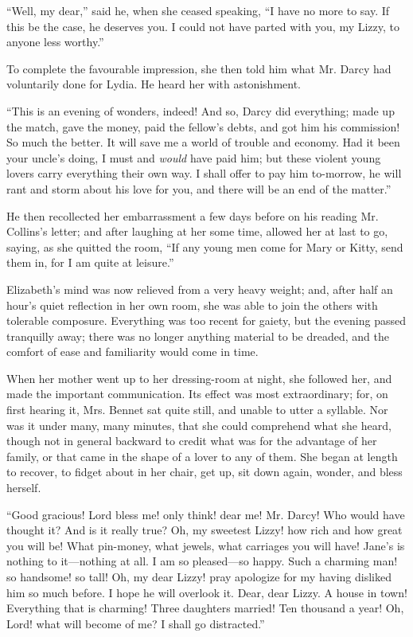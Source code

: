 ``Well, my dear,'' said he, when she ceased speaking, ``I have no more to say. If this be the case, he deserves you. I could not have parted with you, my Lizzy, to anyone less worthy.''

To complete the favourable impression, she then told him what Mr. Darcy had voluntarily done for Lydia. He heard her with astonishment.

``This is an evening of wonders, indeed! And so, Darcy did everything; made up the match, gave the money, paid the fellow's debts, and got him his commission! So much the better. It will save me a world of trouble and economy. Had it been your uncle's doing, I must and \textit{would} have paid him; but these violent young lovers carry everything their own way. I shall offer to pay him to-morrow, he will rant and storm about his love for you, and there will be an end of the matter.''

He then recollected her embarrassment a few days before on his reading Mr. Collins's letter; and after laughing at her some time, allowed her at last to go, saying, as she quitted the room, ``If any young men come for Mary or Kitty, send them in, for I am quite at leisure.''

Elizabeth's mind was now relieved from a very heavy weight; and, after half an hour's quiet reflection in her own room, she was able to join the others with tolerable composure. Everything was too recent for gaiety, but the evening passed tranquilly away; there was no longer anything material to be dreaded, and the comfort of ease and familiarity would come in time.

When her mother went up to her dressing-room at night, she followed her, and made the important communication. Its effect was most extraordinary; for, on first hearing it, Mrs. Bennet sat quite still, and unable to utter a syllable. Nor was it under many, many minutes, that she could comprehend what she heard, though not in general backward to credit what was for the advantage of her family, or that came in the shape of a lover to any of them. She began at length to recover, to fidget about in her chair, get up, sit down again, wonder, and bless herself.

``Good gracious! Lord bless me! only think! dear me! Mr. Darcy! Who would have thought it? And is it really true? Oh, my sweetest Lizzy! how rich and how great you will be! What pin-money, what jewels, what carriages you will have! Jane's is nothing to it---nothing at all. I am so pleased---so happy. Such a charming man! so handsome! so tall! Oh, my dear Lizzy! pray apologize for my having disliked him so much before. I hope he will overlook it. Dear, dear Lizzy. A house in town! Everything that is charming! Three daughters married! Ten thousand a year! Oh, Lord! what will become of me? I shall go distracted.''


